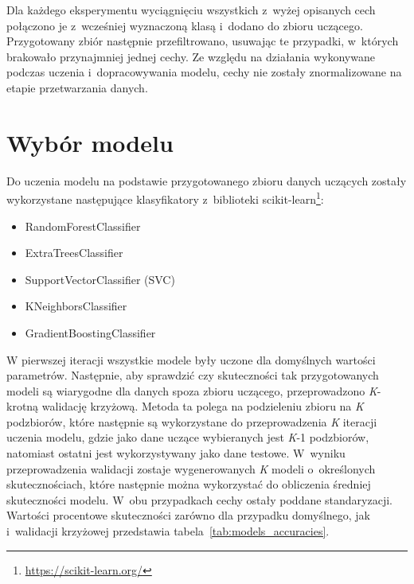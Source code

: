 Dla każdego eksperymentu wyciągnięciu wszystkich z~wyżej opisanych cech połączono je z~wcześniej wyznaczoną klasą i~dodano do zbioru uczącego. Przygotowany zbiór następnie przefiltrowano, usuwając te przypadki, w~których brakowało przynajmniej jednej cechy. Ze względu na działania wykonywane podczas uczenia i~dopracowywania modelu, cechy nie zostały znormalizowane na etapie przetwarzania danych.

\section{Wybór modelu}
Do uczenia modelu na podstawie przygotowanego zbioru danych uczących zostały wykorzystane następujące klasyfikatory z~biblioteki scikit-learn\footnote{\url{https://scikit-learn.org/}}:
\begin{itemize}
	\item RandomForestClassifier
	\item ExtraTreesClassifier
	\item SupportVectorClassifier (SVC)
	\item KNeighborsClassifier
	\item GradientBoostingClassifier
\end{itemize}

W pierwszej iteracji wszystkie modele były uczone dla domyślnych wartości parametrów. Następnie, aby sprawdzić czy skuteczności tak przygotowanych modeli są wiarygodne dla danych spoza zbioru uczącego, przeprowadzono \textit{K}-krotną walidację krzyżową. Metoda ta polega na podzieleniu zbioru na \textit{K} podzbiorów, które następnie są wykorzystane do przeprowadzenia \textit{K} iteracji uczenia modelu, gdzie jako dane uczące wybieranych jest \textit{K}-1 podzbiorów, natomiast ostatni jest wykorzystywany jako dane testowe. W~wyniku przeprowadzenia walidacji zostaje wygenerowanych \textit{K} modeli o~określonych skutecznościach, które następnie można wykorzystać do obliczenia średniej skuteczności modelu. W~obu przypadkach cechy ostały poddane standaryzacji. Wartości procentowe skuteczności zarówno dla przypadku domyślnego, jak i~walidacji krzyżowej przedstawia tabela~\ref{tab:models_accuracies}.

